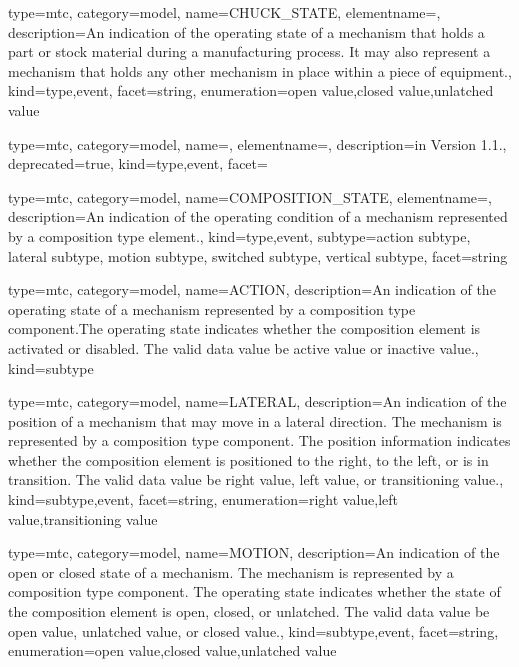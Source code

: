 {
  type=mtc,
  category=model,
  name={CHUCK\_STATE},
  elementname=,
  description={An indication of the operating state of a mechanism that holds a part or stock material during a manufacturing process. It may also represent a mechanism that holds any other mechanism in place within a piece of equipment.},
  kind={type,event},
  facet={\gls{string}},
  enumeration={\gls{open value},\gls{closed value},\gls{unlatched value}}
}


{
  type=mtc,
  category=model,
  name=,
  elementname=,
  description={\DEPRECATED in Version 1.1.},
  deprecated={true},
  kind={type,event},
  facet={}
}


{
  type=mtc,
  category=model,
  name={COMPOSITION\_STATE},
  elementname=,
  description={An indication of the operating condition of a mechanism represented by a \gls{composition} type element.},
  kind={type,event},
  subtype={\gls{action subtype}, \gls{lateral subtype}, \gls{motion subtype}, \gls{switched subtype}, \gls{vertical subtype}},
  facet={\gls{string}}
}


{
  type=mtc,
  category=model,
  name={ACTION},
  description={An indication of the operating state of a mechanism represented by a \gls{composition} type component.\newline The operating state indicates whether the \gls{composition} element is activated or disabled. \newline The \gls{valid data value} \must be \gls{active value} or \gls{inactive value}.},
  kind={subtype}
}


{
  type=mtc,
  category=model,
  name={LATERAL},
  description={An indication of the position of a mechanism that may move in a lateral direction.   The mechanism is represented by a \gls{composition} type component. \newline The position information indicates whether the \gls{composition} element is positioned to the right, to the left, or is in transition.  \newline The \gls{valid data value} \must be \gls{right value}, \gls{left value}, or \gls{transitioning value}.},
  kind={subtype,event},
  facet={\gls{string}},
  enumeration={\gls{right value},\gls{left value},\gls{transitioning value}}
}


{
  type=mtc,
  category=model,
  name={MOTION},
  description={An indication of the open or closed state of a mechanism.   The mechanism is represented by a \gls{composition} type component. \newline The operating state indicates whether the state of the \gls{composition} element is open, closed, or unlatched.   \newline The \gls{valid data value} \must be \gls{open value}, \gls{unlatched value}, or \gls{closed value}.},
  kind={subtype,event},
  facet={\gls{string}},
  enumeration={\gls{open value},\gls{closed value},\gls{unlatched value}}
}


